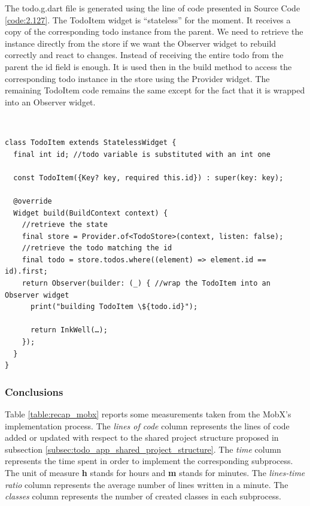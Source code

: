 The todo.g.dart file is generated using the line of code presented in Source Code \ref{code:2.127}. The TodoItem widget is “stateless” for the moment. It receives a copy of the corresponding todo instance from the parent. We need to retrieve the instance directly from the store if we want the Observer widget to rebuild correctly and react to changes. Instead of receiving the entire todo from the parent the id field is enough. It is used then in the build method to access the corresponding todo instance in the store using the Provider widget. The remaining TodoItem code remains the same except for the fact that it is wrapped into an Observer widget.
\begin{code}
\mbox{}\\
 \mbox{}
		\label{code:2.14}
\begin{verbatim}
class TodoItem extends StatelessWidget {
  final int id; //todo variable is substituted with an int one

  const TodoItem({Key? key, required this.id}) : super(key: key);

  @override
  Widget build(BuildContext context) {
    //retrieve the state
    final store = Provider.of<TodoStore>(context, listen: false);
    //retrieve the todo matching the id
    final todo = store.todos.where((element) => element.id == id).first;
    return Observer(builder: (_) { //wrap the TodoItem into an Observer widget
      print("building TodoItem \${todo.id}");

      return InkWell(…);
    });
  }
}
\end{verbatim}
\mbox{}
\end{code}

\subsubsection{Conclusions} \label{par:todo_app_inherited_widget_introduction}
Table \ref{table:recap_mobx} reports some measurements taken from the MobX's implementation process. The \textit{lines of code} column represents the lines of code added or updated with respect to the shared project structure proposed in subsection \ref{subsec:todo_app_shared_project_structure}. The \textit{time }column represents the time spent in order to implement the corresponding subprocess. The unit of measure \textbf{h} stands for hours and \textbf{m} stands for minutes. The \textit{lines-time ratio} column represents the average number of lines written in a minute. The \textit{classes} column represents the number of created classes in each subprocess.

